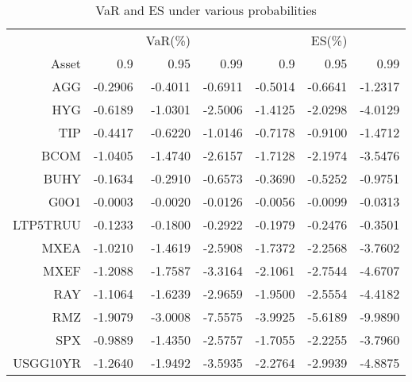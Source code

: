 \documentclass[12pt]{article}
\begin{document}
\begin{table}[!h]
\caption{VaR and ES under various probabilities} %
\centering 
\begin{tabular}{ | r || r r r || r r r | } 
 \hline
 & & VaR(\%) &&& ES(\%) & \\
Asset& 0.9 & 0.95 & 0.99 & 0.9 & 0.95 & 0.99 \\
  \hline \hline
AGG & -0.2906 & -0.4011 & -0.6911 & -0.5014 & -0.6641 & -1.2317\\ 
HYG & -0.6189 & -1.0301 & -2.5006 & -1.4125 & -2.0298 & -4.0129\\ 
TIP & -0.4417 & -0.6220 & -1.0146 & -0.7178 & -0.9100 & -1.4712\\ 
BCOM & -1.0405 & -1.4740 & -2.6157 & -1.7128 & -2.1974 & -3.5476\\ 
BUHY & -0.1634 & -0.2910 & -0.6573 & -0.3690 & -0.5252 & -0.9751\\ 
G0O1 & -0.0003 & -0.0020 & -0.0126 & -0.0056 & -0.0099 & -0.0313\\ 
LTP5TRUU & -0.1233 & -0.1800 & -0.2922 & -0.1979 & -0.2476 & -0.3501\\ 
MXEA & -1.0210 & -1.4619 & -2.5908 & -1.7372 & -2.2568 & -3.7602\\ 
MXEF & -1.2088 & -1.7587 & -3.3164 & -2.1061 & -2.7544 & -4.6707\\ 
RAY & -1.1064 & -1.6239 & -2.9659 & -1.9500 & -2.5554 & -4.4182\\ 
RMZ & -1.9079 & -3.0008 & -7.5575 & -3.9925 & -5.6189 & -9.9890\\ 
SPX & -0.9889 & -1.4350 & -2.5757 & -1.7055 & -2.2255 & -3.7960\\ 
USGG10YR & -1.2640 & -1.9492 & -3.5935 & -2.2764 & -2.9939 & -4.8875 \\
 \hline
\end{tabular}
\label{table:VaRES}
\end{table}
\end{document}
